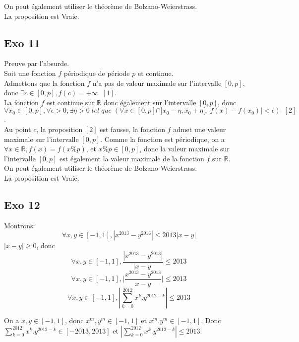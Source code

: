 \documentclass[]{book}
\theoremstyle{definition}
\newcommand{\bb}[1]{\mathbb{#1}}
\newcommand{\R}{\bb{R}}
\begin{document}
On peut \'egalement utiliser le th\'eor\`eme de Bolzano-Weierstrass.\\

La proposition est Vraie.


\subsection*{Exo 11}
Preuve par l'absurde. \\

Soit une fonction $f$ p\'eriodique de p\'eriode $p$ et continue. \\

Admettons que la fonction $f$ n'a pas de valeur maximale sur l'intervalle $[0,p]$, donc $\exists c \in [0,p], f(c) = +\infty\,\,\,[1]$.\\

La fonction $f$ est continue sur $\R$ donc \'egalement sur l'intervalle $[0,p]$, donc $\forall x_0 \in [0,p], \forall \epsilon >0, \exists \eta > 0\; tel\; que\; (\forall x \in [0,p] \cap ]x_0-\eta, x_0+\eta[, |f(x)-f(x_0)| < \epsilon)\,\,\,[2]$. \\ 

Au point $c$, la proposition $[2]$ est fausse, la fonction $f$ admet une valeur maximale sur l'intervalle $[0,p]$. Comme la fonction est p\'eriodique, on a $\forall x \in \R, f(x) = f(x\%p)$, et $x\%p \in [0,p]$, donc la valeur maximale sur l'intervalle $[0,p]$ est \'egalement la valeur maximale de la fonction $f$ sur $\R$. \\


On peut \'egalement utiliser le th\'eor\`eme de Bolzano-Weierstrass.\\

La proposition est Vraie.

\subsection*{Exo 12}
Montrons:
$$\forall x,y \in [-1,1],|x^{2013} - y^{2013}| \le 2013|x-y|$$
$|x-y| \ge 0$, donc
$$\forall x,y \in [-1,1],\frac{|x^{2013} - y^{2013}|}{|x-y|} \le 2013$$
$$\forall x,y \in [-1,1],\Big| \frac{x^{2013} - y^{2013}}{x-y} \Big| \le 2013$$
$$\forall x,y \in [-1,1], |\sum_{k=0}^{2012}x^k.y^{2012-k}| \le 2013$$

On a $x,y \in [-1,1]$, donc $x^m,y^m \in [-1,1]$ et $x^m.y^m \in [-1,1]$. Donc $\sum_{k=0}^{2012}x^k.y^{2012-k} \in [-2013,2013]$ et $|\sum_{k=0}^{2012}x^k.y^{2012-k}| \le 2013$.
\\
\end{document}
